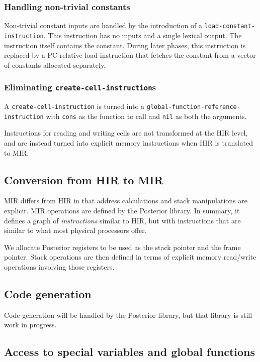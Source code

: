 \subsubsection{Handling non-trivial constants}

Non-trivial constant inputs are handled by the introduction of a
\texttt{load-constant-instruction}.  This instruction has no inputs
and a single lexical output.  The instruction itself contains the
constant.  During later phases, this instruction is replaced by a
PC-relative load instruction that fetches the constant from a vector
of constants allocated separately.

\subsubsection{Eliminating \texttt{create-cell-instruction}s}

A \texttt{create-cell-instruction} is turned into a
\texttt{global-function-reference-instruction} with \texttt{cons} as
the function to call and \texttt{nil} as both the arguments.

Instructions for reading and writing cells are not transformed at the
HIR level, and are instead turned into explicit memory instructions
when HIR is translated to MIR.

\subsection{Conversion from HIR to MIR}

MIR differs from HIR in that address calculations and stack
manipulations are explicit.  MIR operations are defined by the
Posterior library.  In summary, it defines a graph of
\emph{instructions} similar to HIR, but with instructions that are
similar to what most physical processors offer.

We allocate Posterior registers to be used as the stack pointer and
the frame pointer.  Stack operations are then defined in terms of
explicit memory read/write operations involving those registers.

\subsection{Code generation}

Code generation will be handled by the Posterior library, but that
library is still work in progress.

\subsection{Access to special variables and global functions}

